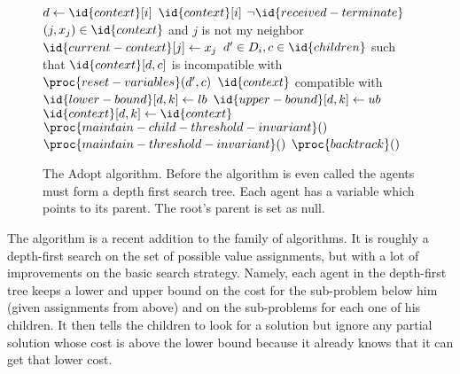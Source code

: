 \begin{SCfigure}
\begin{minipage}{1.0\linewidth}
\begin{codebox}
      \li $d \gets \id{context}[i]$
      \li {} $\id{context}[i]$
      \li \If $\neg \id{received-terminate}$
      \li \Then \For $(j,x_j) \in \id{context}$ and $j$ is not my
      neighbor
      \li       \Do $\id{current-context}[j] \gets x_j$
                \End
      \li       \For $d' \in D_i, c \in \id{children}$ such that
      $\id{context}[d,c]$ is 
      \zi       \>\>\>\>\>\>incompatible with 
      \li       \Do  $\proc{reset-variables}(d',c)$
          \End
      \li \If $\id{context}$ compatible with 
      \li \Then $\id{lower-bound}[d,k] \gets lb$
      \li       $\id{upper-bound}[d,k] \gets ub$
      \li       $\id{context}[d,k] \gets \id{context}$
      \li       $\proc{maintain-child-threshold-invariant}()$
      \li       $\proc{maintain-threshold-invariant}()$
          \End
      \li $\proc{backtrack}()$
    \end{codebox}
  \end{minipage}
  \caption{The Adopt algorithm. Before the algorithm is even
    called the agents must form a depth first search tree. Each agent
    has a  variable which points to its parent. The root's
    parent is set as null.}
  \label{fig:adopt}
\end{SCfigure}

The  algorithm \cite{modi04a} is a recent addition to the
family of  algorithms. It is roughly a depth-first search
on the set of possible value assignments, but with a lot of
improvements on the basic search strategy. Namely, each agent in the
depth-first tree keeps a lower and upper bound on the cost for the
sub-problem below him (given assignments from above) and on the
sub-problems for each one of his children. It then tells the children
to look for a solution but ignore any partial solution whose cost is
above the lower bound because it already knows that it can get that
lower cost.


